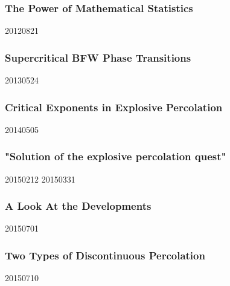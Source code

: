\subsubsection{The Power of Mathematical Statistics}
20120821



\subsubsection{Supercritical BFW Phase Transitions}
20130524



\subsubsection{Critical Exponents in Explosive Percolation}
20140505



\subsubsection{"Solution of the explosive percolation quest"}
20150212
20150331



\subsubsection{A Look At the Developments}
20150701



\subsubsection{Two Types of Discontinuous Percolation}
20150710
